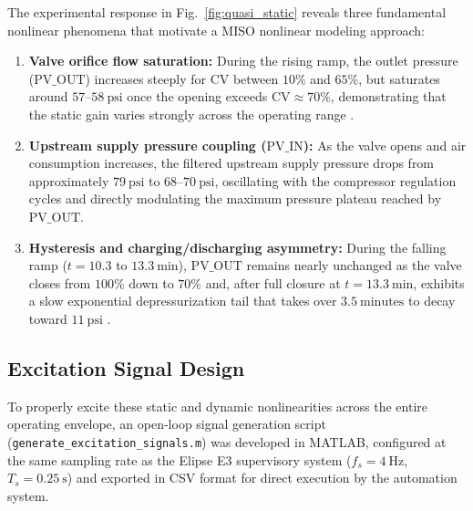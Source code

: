 \documentclass{ifacconf}
\begin{document}
The experimental response in Fig.~\ref{fig:quasi_static} reveals three fundamental nonlinear phenomena that motivate a MISO nonlinear modeling approach:
\begin{enumerate}
    \item \textbf{Valve orifice flow saturation:} During the rising ramp, the outlet pressure ($\mathrm{PV\_OUT}$) increases steeply for $\mathrm{CV}$ between $10\%$ and $65\%$, but saturates around $57\text{--}58~\text{psi}$ once the opening exceeds $\mathrm{CV} \approx 70\%$, demonstrating that the static gain varies strongly across the operating range \citep{Schwarz2024ModelBased}.
    \item \textbf{Upstream supply pressure coupling ($\mathrm{PV\_IN}$):} As the valve opens and air consumption increases, the filtered upstream supply pressure drops from approximately $79~\text{psi}$ to $68\text{--}70~\text{psi}$, oscillating with the compressor regulation cycles and directly modulating the maximum pressure plateau reached by $\mathrm{PV\_OUT}$.
    \item \textbf{Hysteresis and charging/discharging asymmetry:} During the falling ramp ($t = 10.3$ to $13.3~\text{min}$), $\mathrm{PV\_OUT}$ remains nearly unchanged as the valve closes from $100\%$ down to $70\%$ and, after full closure at $t = 13.3~\text{min}$, exhibits a slow exponential depressurization tail that takes over $3.5~\text{minutes}$ to decay toward $11~\text{psi}$ \citep{Sun2025PneumaticSoftActuator}.
\end{enumerate}

\subsection{Excitation Signal Design} \label{subsec:excitation}

To properly excite these static and dynamic nonlinearities across the entire operating envelope, an open-loop signal generation script (\texttt{generate\_excitation\_signals.m}) was developed in MATLAB, configured at the same sampling rate as the Elipse E3 supervisory system ($f_s = 4~\text{Hz}$, $T_s = 0.25~\text{s}$) and exported in CSV format for direct execution by the automation system.
\end{document}
